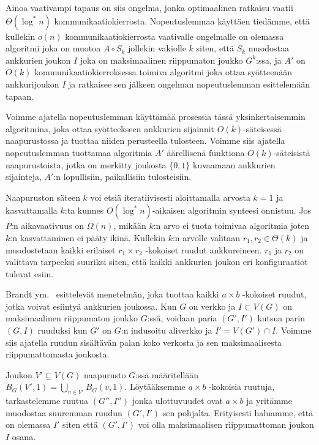 \documentclass[12pt,finnish]{tktltiki2}
\theoremstyle{definition}
\theoremstyle{remark}
\begin{document}
Ainoa vaativampi tapaus on siis ongelma, jonka optimaalinen ratkaisu vaatii $\Theta(\log^* n)$ kommunikaatiokierrosta. Nopeutuslemmaa käyttäen tiedämme, että kullekin $o(n)$ kommunikaatiokierrosta vaativalle ongelmalle on olemassa algoritmi joka on muotoa $A \circ S_k$ jollekin vakiolle $k$ siten, että $S_k$ muodostaa ankkurien joukon $I$ joka on maksimaalinen riippumaton joukko $G^k$:ssa, ja $A'$ on $O(k)$ kommunikaatiokierroksessa toimiva algoritmi joka ottaa syötteenään ankkurijoukon $I$ ja ratkaisee sen jälkeen ongelman nopeutuslemman esittelemään tapaan.

Voimme ajatella nopeutuslemman käyttämää prosessia tässä yksinkertaisemmin algoritmina, joka ottaa syötteekseen ankkurien sijainnit $O(k)$-säteisessä naapurustossa ja tuottaa niiden perusteella tulosteen. Voimme siis ajatella nopeutuslemman tuottamaa algoritmia $A'$ äärellisenä funktiona $O(k)$-säteisistä naapurustoista, jotka on merkitty joukosta $\{0, 1\}$ kuvaamaan ankkurien sijainteja, $A'$:n lopullisiin, paikallisiin tulosteisiin.

Naapuruston säteen $k$ voi etsiä iteratiivisesti aloittamalla arvosta $k = 1$ ja kasvattamalla $k$:ta kunnes $O(\log^* n)$-aikaisen algoritmin synteesi onnistuu. Jos $P$:n aikavaativuus on $\Omega(n)$, mikään $k$:n arvo ei tuota toimivaa algoritmia joten $k$:n kasvattaminen ei pääty ikinä. Kullekin $k$:n arvolle valitaan $r_1, r_2 \in \Theta(k)$ ja muodostetaan kaikki erilaiset $r_1 \times r_2$ -kokoiset ruudut ankkureineen. $r_1$ ja $r_2$ on valittava tarpeeksi suuriksi siten, että kaikki ankkurien joukon eri konfiguraatiot tulevat esiin.

Brandt ym.~\cite{brandt} esittelevät menetelmän, joka tuottaa kaikki $a \times b$ -kokoiset ruudut, jotka voivat esiintyä ankkurien joukossa. Kun $G$ on verkko ja $I \subset V(G)$ on maksimaalinen riippumaton joukko $G$:ssä, voidaan paria $(G', I')$ kutsua parin $(G, I)$ ruuduksi kun $G'$ on $G$:n indusoitu aliverkko ja $I' = V(G') \cap I$. Voimme siis ajatella ruudun sisältävän palan koko verkosta ja sen maksimaalisesta riippumattomasta joukosta.

Joukon $V' \subseteq V(G)$ naapurusto $G$:ssä määritellään $B_G(V', 1) = \bigcup_{v \in V'} B_G(v, 1)$. Löytääksemme $a \times b$ -kokoisia ruutuja, tarkastelemme ruutua $(G'', I'')$ jonka ulottuvuudet ovat $a \times b$ ja yritämme muodostaa suuremman ruudun $(G', I')$ sen pohjalta. Erityisesti haluamme, että on olemassa $I'$ siten että $(G', I')$ voi olla maksimaalisen riippumattoman joukon $I$ osana.
\end{document}

